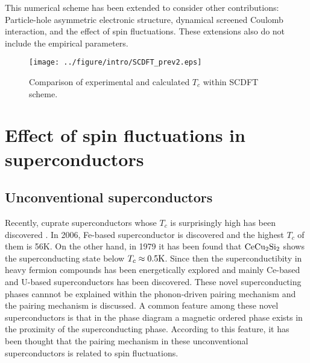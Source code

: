 This numerical scheme has been extended to consider other contributions:
Particle-hole asymmetric electronic structure\cite{RA2013phasy}, dynamical screened Coulomb 
interaction\cite{RA2013}, and the effect of spin fluctuations\cite{Essenberger2014}.
These extensions also do not include the empirical parameters. 

\begin{figure} %
	\centering
	\texttt{[image: ../figure/intro/SCDFT\_prev2.eps]}
	\caption{Comparison of experimental and calculated $T_c$ 
		within SCDFT scheme\cite{Marques2005, Sanna2007, Floris2005}.}
	\label{fig:scdft_compare}
\end{figure}


\section{Effect of spin fluctuations in superconductors} %
\subsection{Unconventional superconductors}
Recently, cuprate superconductors whose $T_c$ is surprisingly high has been discovered
\cite{Bednorz1986}. In 2006, Fe-based superconductor is discovered\cite{Kamihara2006} and the highest
$T_c$ of them is 56K\cite{wang2008}. On the other hand, in 1979 it has been found that $\rm CeCu_2Si_2$ 
shows the superconducting state below $T_c \approx 0.5\rm K$\cite{Steglich1979}. Since then the superconductibity in
heavy fermion compounds has been energetically explored and mainly Ce-based and U-based superconductors
has been discovered\cite{Pfleiderer2009}.
These novel superconducting phases cannnot be explained within the phonon-driven pairing mechanism and
the pairing mechanism is discussed\cite{Scalapino2012}.
A common feature among these novel superconductors is that in the phase diagram a magnetic ordered 
phase exists in the proximity of the superconducting phase.
According to this feature, it has been thought that the pairing mechanism in these unconventional
superconductors is related to spin fluctuations\cite{Scalapino2012}.


